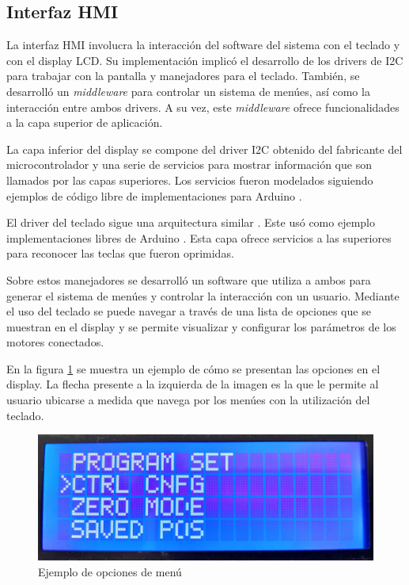 \subsection{Interfaz HMI}

La interfaz HMI involucra la interacción del software del sistema con el teclado y con el display LCD. Su implementación implicó el desarrollo de los drivers de I2C para trabajar con la pantalla y manejadores para el teclado. También, se desarrolló un \textit{middleware} para controlar un sistema de menúes, así como la interacción entre ambos drivers. A su vez, este \textit{middleware} ofrece funcionalidades a la capa superior de aplicación.

La capa inferior del display se compone del driver I2C obtenido del fabricante del microcontrolador y una serie de servicios para mostrar información que son llamados por las capas superiores. Los servicios fueron modelados siguiendo ejemplos de código libre de implementaciones para Arduino \citep{web_repo_display_i2c}.

El driver del teclado sigue una arquitectura similar \citep{web_repo_keypad}. Este usó como ejemplo implementaciones libres de Arduino \citep{web_repo_keypad}. Esta capa ofrece servicios a las superiores para reconocer las teclas que fueron oprimidas.

Sobre estos manejadores se desarrolló un software que utiliza a ambos para generar el sistema de menúes y controlar la interacción con un usuario. Mediante el uso del teclado se puede navegar a través de una lista de opciones que se muestran en el display y se permite visualizar y configurar los parámetros de los motores conectados. 

En la figura \ref{fig:menu} se muestra un ejemplo de cómo se presentan las opciones en el display. La flecha presente a la izquierda de la imagen es la que le permite al usuario ubicarse a medida que navega por los menúes con la utilización del teclado.

\begin{figure}[htbp]
	\centering
	\includegraphics[scale=.08]{./Figures/display_menu.jpg}
	\caption{Ejemplo de opciones de menú}
	\label{fig:menu}
\end{figure}

